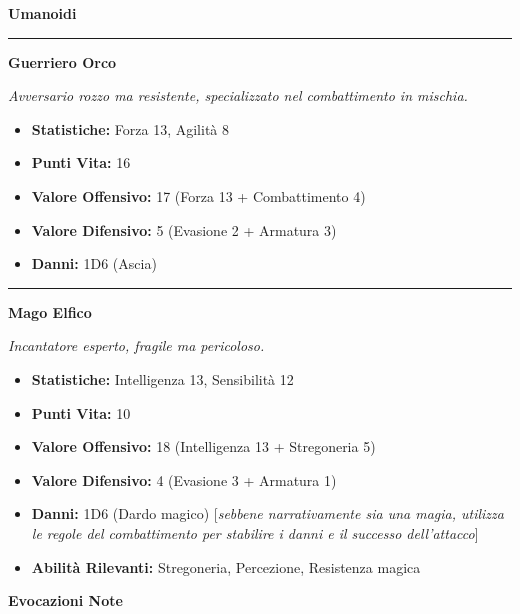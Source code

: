 \documentclass[../manuale_main.tex]{subfiles}
\begin{document}
\clearpage
{\zarafirtitlefont\Large\bfseries Umanoidi}
\vspace{0.2cm}
\noindent
\begin{center}
\rule{\textwidth}{0.4pt} 
\end{center}
\vspace{0.2cm}
{\zarafirtitlefont\Large\bfseries\noindent Guerriero Orco}
\vspace{0.2cm}



\textit{Avversario rozzo ma resistente, specializzato nel combattimento in mischia.}
\begin{itemize}
\item \textbf{Statistiche:} Forza 13, Agilità 8
\item \textbf{Punti Vita:} 16
\item \textbf{Valore Offensivo:} 17 (Forza 13 + Combattimento 4)
\item \textbf{Valore Difensivo:} 5 (Evasione 2 + Armatura 3)
\item \textbf{Danni:} 1D6 (Ascia)
\end{itemize}
\vspace{0.2cm}
\noindent
\begin{center}
\rule{\textwidth}{0.4pt} 
\end{center}
\vspace{0.2cm}
{\zarafirtitlefont\Large\bfseries\noindent Mago Elfico}
\vspace{0.2cm}



\textit{Incantatore esperto, fragile ma pericoloso.}
\begin{itemize}
\item \textbf{Statistiche:} Intelligenza 13, Sensibilità 12
\item \textbf{Punti Vita:} 10
\item \textbf{Valore Offensivo:} 18 (Intelligenza 13 + Stregoneria 5)
\item \textbf{Valore Difensivo:} 4 (Evasione 3 + Armatura 1)
\item \textbf{Danni:} 1D6 (Dardo magico) [\textit{sebbene narrativamente sia una magia, utilizza le regole del combattimento per stabilire i danni e il successo dell'attacco}]
\item \textbf{Abilità Rilevanti:} Stregoneria, Percezione, Resistenza magica
\end{itemize}

\clearpage
{\zarafirtitlefont\Large\bfseries Evocazioni Note}
\end{document}
